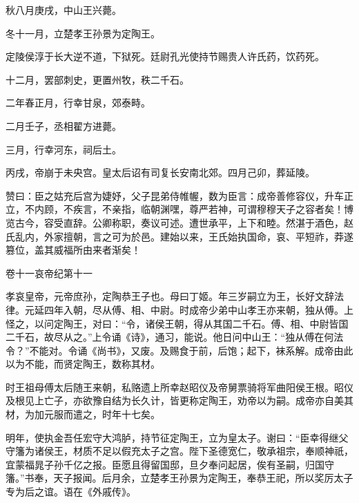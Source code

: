 \documentclass[12pt,UTF8]{ctexbook}
\begin{document}
秋八月庚戌，中山王兴薨。



冬十一月，立楚孝王孙景为定陶王。



定陵侯淳于长大逆不道，下狱死。廷尉孔光使持节赐贵人许氏药，饮药死。



十二月，罢部刺史，更置州牧，秩二千石。



二年春正月，行幸甘泉，郊泰畤。



二月壬子，丞相翟方进薨。



三月，行幸河东，祠后土。



丙戌，帝崩于未央宫。皇太后诏有司复长安南北郊。四月己卯，葬延陵。



赞曰：臣之姑充后宫为婕妤，父子昆弟侍帷幄，数为臣言：成帝善修容仪，升车正立，不内顾，不疾言，不亲指，临朝渊嘿，尊严若神，可谓穆穆天子之容者矣！博览古今，容受直辞。公卿称职，奏议可述。遭世承平，上下和睦。然湛于酒色，赵氏乱内，外家擅朝，言之可为於邑。建始以来，王氏始执国命，哀、平短祚，莽遂篡位，盖其威福所由来者渐矣！





卷十一哀帝纪第十一



孝哀皇帝，元帝庶孙，定陶恭王子也。母曰丁姬。年三岁嗣立为王，长好文辞法律。元延四年入朝，尽从傅、相、中尉。时成帝少弟中山孝王亦来朝，独从傅。上怪之，以问定陶王，对曰：“令，诸侯王朝，得从其国二千石。傅、相、中尉皆国二千石，故尽从之。”上令诵《诗》，通习，能说。他日问中山王：“独从傅在何法令？”不能对。令诵《尚书》，又废。及赐食于前，后饱；起下，袜系解。成帝由此以为不能，而贤定陶王，数称其材。



时王祖母傅太后随王来朝，私赂遗上所幸赵昭仪及帝舅票骑将军曲阳侯王根。昭仪及根见上亡子，亦欲豫自结为长久计，皆更称定陶王，劝帝以为嗣。成帝亦自美其材，为加元服而遣之，时年十七矣。



明年，使执金吾任宏守大鸿胪，持节征定陶王，立为皇太子。谢曰：“臣幸得继父守籓为诸侯王，材质不足以假充太子之宫。陛下圣德宽仁，敬承祖宗，奉顺神祇，宜蒙福晁子孙千亿之报。臣愿且得留国邸，旦夕奉问起居，俟有圣嗣，归国守籓。”书奉，天子报闻。后月余，立楚孝王孙景为定陶王，奉恭王祀，所以奖厉太子专为后之谊。语在《外戚传》。
\end{document}
